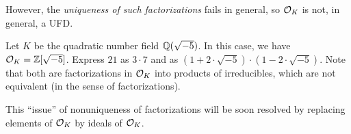 However, the \emph{uniqueness of such factorizations} fails in general, so $\mathcal{O}_{K}$ is not, in general, a UFD.
\begin{example}
  Let $K$ be the quadratic number field $\mathbb{Q}(\sqrt{-5})$.
  In this case, we have $\mathcal{O}_{K} = \mathbb{Z}[\sqrt{-5}]$.
  Express $21$ as $3 \cdot 7$ and as $(1 + 2 \cdot \sqrt{-5}) \cdot (1 - 2 \cdot \sqrt{-5})$.
  Note that both are factorizations in $\mathcal{O}_{K}$ into products of irreducibles, which are not equivalent (in the sense of factorizations).
\end{example}

This ``issue'' of nonuniqueness of factorizations will be soon resolved by replacing elements of $\mathcal{O}_{K}$ by ideals of $\mathcal{O}_{K}$.

